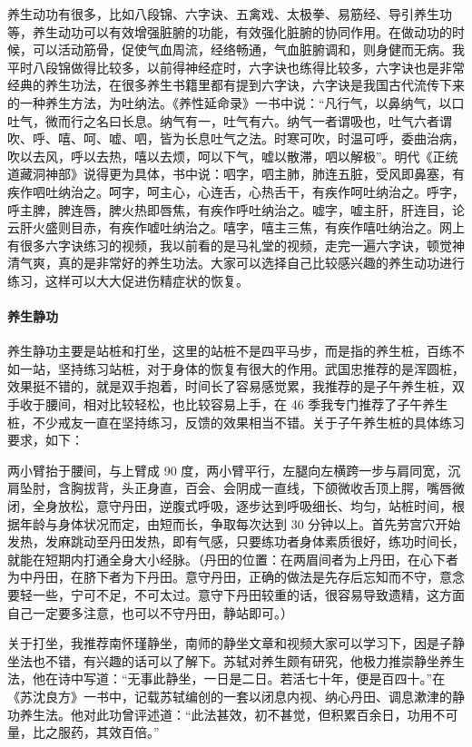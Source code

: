 养生动功有很多，比如八段锦、六字诀、五禽戏、太极拳、易筋经、导引养生功等，养生动功可以有效增强脏腑的功能，有效强化脏腑的协同作用。在做动功的时候，可以活动筋骨，促使气血周流，经络畅通，气血脏腑调和，则身健而无病。我平时八段锦做得比较多，以前得神经症时，六字诀也练得比较多，六字诀也是非常经典的养生功法，在很多养生书籍里都有提到六字诀，六字诀是我国古代流传下来的一种养生方法，为吐纳法。《养性延命录》一书中说：“凡行气，以鼻纳气，以口吐气，微而行之名曰长息。纳气有一，吐气有六。纳气一者谓吸也，吐气六者谓吹、呼、嘻、呵、嘘、呬，皆为长息吐气之法。时寒可吹，时温可呼，委曲治病，吹以去风，呼以去热，嘻以去烦，呵以下气，嘘以散滞，呬以解极”。明代《正统道藏洞神部》说得更为具体，书中说：呬字，呬主肺，肺连五脏，受风即鼻塞，有疾作呬吐纳治之。呵字，呵主心，心连舌，心热舌干，有疾作呵吐纳治之。呼字，呼主脾，脾连唇，脾火热即唇焦，有疾作呼吐纳治之。嘘字，嘘主肝，肝连目，论云肝火盛则目赤，有疾作嘘吐纳治之。嘻字，嘻主三焦，有疾作嘻吐纳治之。网上有很多六字诀练习的视频，我以前看的是马礼堂的视频，走完一遍六字诀，顿觉神清气爽，真的是非常好的养生功法。大家可以选择自己比较感兴趣的养生动功进行练习，这样可以大大促进伤精症状的恢复。

\paragraph{养生静功}

养生静功主要是站桩和打坐，这里的站桩不是四平马步，而是指的养生桩，百练不如一站，坚持练习站桩，对于身体的恢复有很大的作用。武国忠推荐的是浑圆桩，效果挺不错的，就是双手抱着，时间长了容易感觉累，我推荐的是子午养生桩，双手收于腰间，相对比较轻松，也比较容易上手，在 46 季我专门推荐了子午养生桩，不少戒友一直在坚持练习，反馈的效果相当不错。关于子午养生桩的具体练习要求，如下：

两小臂抬于腰间，与上臂成 90 度，两小臂平行，左腿向左横跨一步与肩同宽，沉肩坠肘，含胸拔背，头正身直，百会、会阴成一直线，下颌微收舌顶上腭，嘴唇微闭，全身放松，意守丹田，逆腹式呼吸，逐步达到呼吸细长、均匀，站桩时间，根据年龄与身体状况而定，由短而长，争取每次达到 30 分钟以上。首先劳宫穴开始发热，发麻跳动至丹田发热，即有气感，只要练功者身体素质很好，练功时间长，就能在短期内打通全身大小经脉。（丹田的位置：在两眉间者为上丹田，在心下者为中丹田，在脐下者为下丹田。意守丹田，正确的做法是先存后忘知而不守，意念要轻一些，宁可不足，不可太过。意守下丹田较重的话，很容易导致遗精，这方面自己一定要多注意，也可以不守丹田，静站即可。）

关于打坐，我推荐南怀瑾静坐，南师的静坐文章和视频大家可以学习下，因是子静坐法也不错，有兴趣的话可以了解下。苏轼对养生颇有研究，他极力推崇静坐养生法，他在诗中写道：“无事此静坐，一日是二日。若活七十年，便是百四十。”在《苏沈良方》一书中，记载苏轼编创的一套以闭息内视、纳心丹田、调息漱津的静功养生法。他对此功曾评述道：“此法甚效，初不甚觉，但积累百余日，功用不可量，比之服药，其效百倍。”

